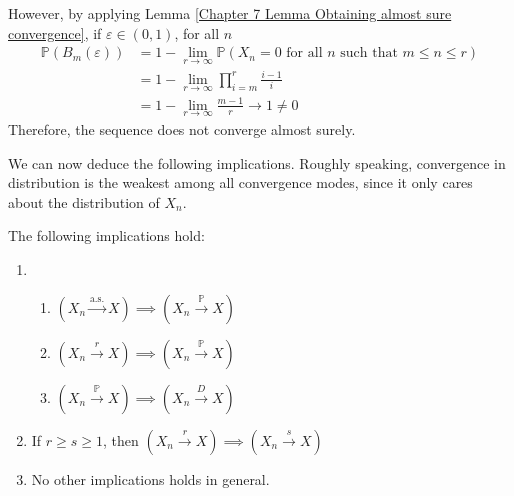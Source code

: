 \documentclass{huhtakm-template-book}
\newcommand{\prob}{\mathbb{P}}
\begin{document}
\begin{proofing}
\begin{enumerate}
\begin{equation*}
            \end{equation*}
            However, by applying Lemma \ref{Chapter 7 Lemma Obtaining almost sure convergence}, if $\varepsilon\in(0,1)$, for all $n$
            \begin{align*}
                \prob(B_{m}(\varepsilon))&=1-\lim_{r\to\infty}\prob(X_{n}=0\text{ for all }n\text{ such that }m\leq n\leq r)\\
                &=1-\lim_{r\to\infty}\prod_{i=m}^{r}\frac{i-1}{i}\\
                &=1-\lim_{r\to\infty}\frac{m-1}{r}\to 1\neq 0
            \end{align*}
            Therefore, the sequence does not converge almost surely.
        \end{enumerate}
    \end{proofing}
    We can now deduce the following implications. Roughly speaking, convergence in distribution is the weakest among all convergence modes, since it only cares about the distribution of $X_{n}$.
    \begin{thm}
        \label{Chapter 7 Theorem implications of different convergence modes}
        The following implications hold:
        \begin{enumerate}
            \item \begin{enumerate}
                \item $(X_{n}\xrightarrow{\text{a.s.}}X)\implies(X_{n}\xrightarrow{\prob}X)$
                \item $(X_{n}\xrightarrow{r}X)\implies(X_{n}\xrightarrow{\prob}X)$
                \item $(X_{n}\xrightarrow{\prob}X)\implies(X_{n}\xrightarrow{D}X)$
            \end{enumerate}
            \item If $r\geq s\geq 1$, then $(X_{n}\xrightarrow{r}X)\implies(X_{n}\xrightarrow{s}X)$
            \item No other implications holds in general.
        \end{enumerate}
    \end{thm}
    \newpage
\end{document}
